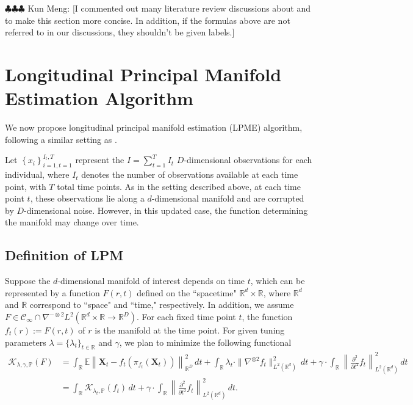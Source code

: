 \documentclass[11pt,reqno]{article}
\newcommand{\meng}[1]{{\color{purple} \sf $\clubsuit\clubsuit\clubsuit$ Kun Meng: [#1]}}
\theoremstyle{definition}
\begin{document}
\meng{I commented out many literature review discussions about \cite{hastiePrincipalCurves1989} and \cite{smolaRegularizedPrincipalManifolds2001} to make this section more concise. In addition, if the formulas above are not referred to in our discussions, they shouldn't be given labels.}

\section{Longitudinal Principal Manifold Estimation Algorithm}

We now propose longitudinal principal manifold estimation (LPME) algorithm, following a similar setting as \cite{mengPrincipalManifoldEstimation2021}. 

Let $\left\{x_i\right\}_{i=1, t=1}^{I_t, T}$ represent the $I = \sum_{t=1}^{T}I_t$ $D$-dimensional observations for each individual, where $I_t$ denotes the number of observations available at each time point, with $T$ total time points. As in the setting described above, at each time point $t$, these observations lie along a $d$-dimensional manifold and are corrupted by $D$-dimensional noise. However, in this updated case, the function determining the manifold may change over time.

\subsection{Definition of LPM}

Suppose the $d$-dimensional manifold of interest depends on time $t$, which can be represented by a function $F(r,t)$ defined on the ``spacetime" $\mathbb{R}^d\times\mathbb{R}$, where $\mathbb{R}^d$ and $\mathbb{R}$ correspond to ``space" and ``time," respectively. In addition, we assume $F\in\mathcal{C}_\infty\cap\nabla^{-\otimes2}L^2(\mathbb{R}^d\times\mathbb{R}\rightarrow\mathbb{R}^D)$. For each fixed time point $t$, the function $f_t(r):=F(r,t)$ of $r$ is the manifold at the time point. For given tuning parameters $\lambda=\{\lambda_t\}_{t\in\mathbb{R}}$ and $\gamma$, we plan to minimize the following functional
\begin{align}
  \mathcal{K}_{\lambda, \gamma, \mathbb{P}}(F) &= \int_\mathbb{R} \mathbb{E}\left\|\boldsymbol{X}_t - f_t\left(\pi_{f_t}(\boldsymbol{X}_t)\right)\right\|_{\mathbb{R}^{D}}^2 \, dt + \int_\mathbb{R} \lambda_t \cdot\|\nabla^{\otimes 2}f_t\|_{L^2(\mathbb{R}^{d})}^2 \, dt + \gamma\cdot \int_{\mathbb{R}}\left\|\frac{\partial^2}{\partial t^2}f_t\right\|_{L^2(\mathbb{R}^d)}^2 \, dt \label{eq:11} \\
  &= \int_{\mathbb{R}}\mathcal{K}_{\lambda_t, \mathbb{P}}(f_t) \, dt + \gamma \cdot \int_{\mathbb{R}}\left\|\frac{\partial^2}{\partial t^2}f_t\right\|_{L^2(\mathbb{R}^d)}^2 \, dt \nonumber
.\end{align}
\end{document}
